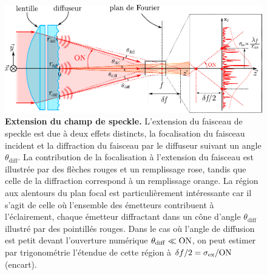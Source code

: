 \begin{figure}
\centering
\includegraphics[width=\textwidth]{Fig/Speckle/speckle_extension.pdf}
\caption{\textbf{Extension du champ de speckle.} L'extension du faisceau de speckle est due à deux effets distincts, la focalisation du faisceau incident et la diffraction du faisceau par le diffuseur suivant un angle $\theta_{\mathrm{diff}}$. La contribution de la focalisation à l'extension du faisceau est illustrée par des flèches rouges et un remplissage rose, tandis que celle de la diffraction correspond à un remplissage orange. La région aux alentours du plan focal est particulièrement intéressante car il s'agit de celle où l'ensemble des émetteurs contribuent à l'éclairement, chaque émetteur diffractant dans un cône d'angle $\theta_{\mathrm{diff}}$ illustré par des pointillés rouges. Dans le cas où l'angle de diffusion est petit devant l'ouverture numérique $\theta_{\mathrm{diff}} \ll \mathrm{ON}$, on peut estimer par trigonométrie l'étendue de cette région à $\delta f/2= \sigma_{\mathrm{ex}} / \mathrm{ON}$ (encart).}
\label{fig:speckle_extension}
\end{figure}

